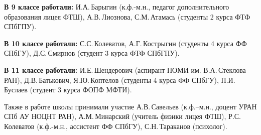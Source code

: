 \documentclass[12pt,a4paper,oneside]{scrartcl}
\newlength{\h}
\newlength{\x}
\begin{document}
\textbf{В 9 классе работали:} И.А.\,Барыгин (к.ф.-м.н., педагог дополнительного
образования лицея ФТШ), А.В.\,Лиознова, С.М.\,Атамась (студенты 2 курса
ФТФ СПбГПУ).

\begin{figure}[h]
  \centering
  \centering
  \hspace{0.4cm}
  \hspace{0.4cm}
\end{figure}

\textbf{В 10 классе работали:} С.С.\,Колеватов, А.Г.\,Кострыгин (студенты 4
курса ФФ СПбГУ), Д.С.\,Смирнов (студент 3 курса ФТФ СПбГПУ).

\begin{figure}[h]
  \centering
  \centering
  \hspace{0.4cm}
  \hspace{0.4cm}
\end{figure}


\textbf{В 11 классе работали:} И.Е.\,Шендерович (аспирант ПОМИ
им. В.А.\,Стеклова РАН), Д.В.\,Батькович, Я.Ю.\,Коптелов (студенты 4 курса
ФФ СПбГУ), П.И.\,Буслаев (студент 3 курса ФОПФ МФТИ).

\begin{figure}[h]
  \centering
  \centering
  \hspace{0.2cm}
  \hspace{0.2cm}
  \hspace{0.2cm}
\end{figure}

Также в работе школы принимали участие А.В.\,Савельев (к.ф.–м.н.,
доцент УРАН СПб АУ НОЦНТ РАН), А.М.\,Минарский (учитель физики лицея
ФТШ), Р.С.\,Колеватов (к.ф.-м.н., ассистент ФФ СПбГУ), С.Н.\,Тараканов
(психолог).

\begin{figure}[h]
  \centering
  \hspace{0.2cm}
  \hspace{0.2cm}
\end{figure}
\end{document}
